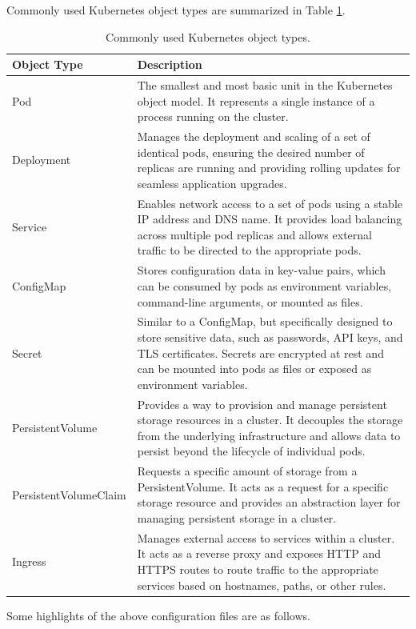 Commonly used Kubernetes object types are summarized in Table \ref{ch:vac:tab:objtype}.
\begin{table}[htbp]
  \centering
  \caption{Commonly used Kubernetes object types.} \label{ch:vac:tab:objtype}
  \begin{tabularx}{\textwidth}{lX}
    \hline
    Object Type & Description \\
    \hline
    Pod & The smallest and most basic unit in the Kubernetes object model. It represents a single instance of a process running on the cluster. \\ \hdashline
    Deployment & Manages the deployment and scaling of a set of identical pods, ensuring the desired number of replicas are running and providing rolling updates for seamless application upgrades. \\ \hdashline
    Service & Enables network access to a set of pods using a stable IP address and DNS name. It provides load balancing across multiple pod replicas and allows external traffic to be directed to the appropriate pods. \\ \hdashline
    ConfigMap & Stores configuration data in key-value pairs, which can be consumed by pods as environment variables, command-line arguments, or mounted as files. \\ \hdashline
    Secret & Similar to a ConfigMap, but specifically designed to store sensitive data, such as passwords, API keys, and TLS certificates. Secrets are encrypted at rest and can be mounted into pods as files or exposed as environment variables. \\ \hdashline
    PersistentVolume & Provides a way to provision and manage persistent storage resources in a cluster. It decouples the storage from the underlying infrastructure and allows data to persist beyond the lifecycle of individual pods. \\ \hdashline
    PersistentVolumeClaim & Requests a specific amount of storage from a PersistentVolume. It acts as a request for a specific storage resource and provides an abstraction layer for managing persistent storage in a cluster. \\ \hdashline
    Ingress & Manages external access to services within a cluster. It acts as a reverse proxy and exposes HTTP and HTTPS routes to route traffic to the appropriate services based on hostnames, paths, or other rules. \\
    \hline
  \end{tabularx}
\end{table}
Some highlights of the above configuration files are as follows.
